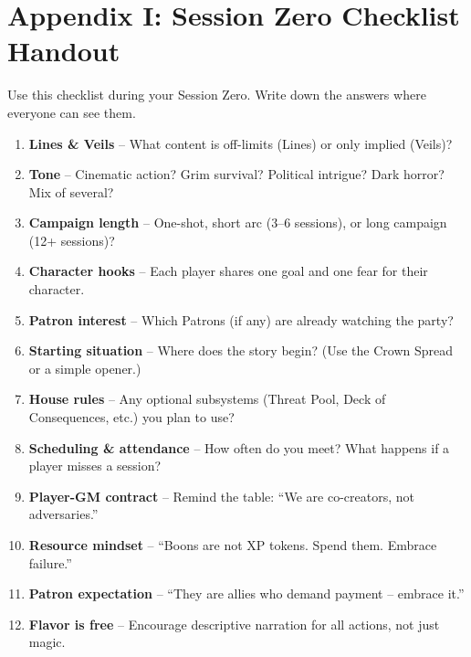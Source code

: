\clearpage
\section*{Appendix I: Session Zero Checklist Handout}
\label{app:session-zero-handout}

\begin{tcolorbox}[colback=green!5!white, colframe=green!75!black, title=Session Zero Checklist, fonttitle=\bfseries,breakable]
Use this checklist during your Session Zero. Write down the answers where everyone can see them.
\begin{enumerate}
  \item \textbf{Lines \& Veils} -- What content is off-limits (Lines) or only implied (Veils)?
  \item \textbf{Tone} -- Cinematic action? Grim survival? Political intrigue? Dark horror? Mix of several?
  \item \textbf{Campaign length} -- One-shot, short arc (3--6 sessions), or long campaign (12+ sessions)?
  \item \textbf{Character hooks} -- Each player shares one goal and one fear for their character.
  \item \textbf{Patron interest} -- Which Patrons (if any) are already watching the party?
  \item \textbf{Starting situation} -- Where does the story begin? (Use the Crown Spread or a simple opener.)
  \item \textbf{House rules} -- Any optional subsystems (Threat Pool, Deck of Consequences, etc.) you plan to use?
  \item \textbf{Scheduling \& attendance} -- How often do you meet? What happens if a player misses a session?
  \item \textbf{Player-GM contract} -- Remind the table: ``We are co-creators, not adversaries.''
  \item \textbf{Resource mindset} -- ``Boons are not XP tokens. Spend them. Embrace failure.''
  \item \textbf{Patron expectation} -- ``They are allies who demand payment -- embrace it.''
  \item \textbf{Flavor is free} -- Encourage descriptive narration for all actions, not just magic.
\end{enumerate}
\end{tcolorbox}
